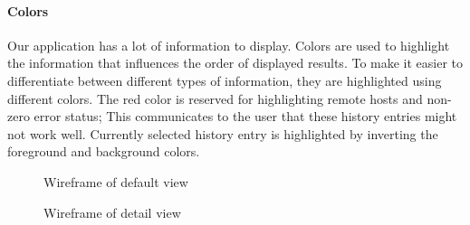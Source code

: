 \paragraph{Colors}

Our application has a lot of information to display. 
Colors are used to highlight the information that influences the order of displayed results. To make it easier to differentiate between different types of information, they are highlighted using different colors. 
The red color is reserved for highlighting remote hosts and non-zero error status; This communicates to the user that these history entries might not work well.
Currently selected history entry is highlighted by inverting the foreground and background colors.



\begin{figure}[h!]
\caption{Wireframe of default view}
\label{wireframe-normal}
\end{figure}

\begin{figure}[h!]
\caption{Wireframe of detail view}
\label{wireframe-detail}
\end{figure}


